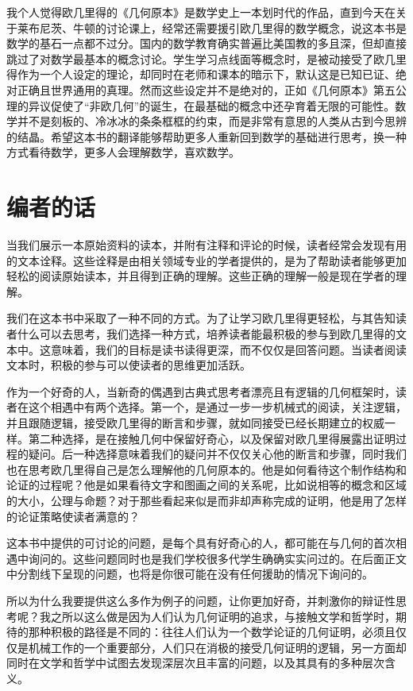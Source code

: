 \documentclass[
]{book}
\begin{document}
我个人觉得欧几里得的《几何原本》是数学史上一本划时代的作品，直到今天在关于莱布尼茨、牛顿的讨论课上，经常还需要援引欧几里得的数学概念，说这本书是数学的基石一点都不过分。国内的数学教育确实普遍比美国教的多且深，但却直接跳过了对数学最基本的概念讨论。学生学习点线面等概念时，是被动接受了欧几里得作为一个人设定的理论，却同时在老师和课本的暗示下，默认这是已知已证、绝对正确且世界通用的真理。然而这些设定并不是绝对的，正如《几何原本》第五公理的异议促使了``非欧几何''的诞生，在最基础的概念中还孕育着无限的可能性。数学并不是刻板的、冷冰冰的条条框框的约束，而是非常有意思的人类从古到今思辨的结晶。希望这本书的翻译能够帮助更多人重新回到数学的基础进行思考，换一种方式看待数学，更多人会理解数学，喜欢数学。

\hypertarget{ux7f16ux8005ux7684ux8bdd}{%
\chapter*{编者的话}\label{ux7f16ux8005ux7684ux8bdd}}

当我们展示一本原始资料的读本，并附有注释和评论的时候，读者经常会发现有用的文本诠释。这些诠释是由相关领域专业的学者提供的，是为了帮助读者能够更加轻松的阅读原始读本，并且得到正确的理解。这些正确的理解一般是现在学者的理解。

我们在这本书中采取了一种不同的方式。为了让学习欧几里得更轻松，与其告知读者什么可以去思考，我们选择一种方式，培养读者能最积极的参与到欧几里得的文本中。这意味着，我们的目标是读书读得更深，而不仅仅是回答问题。当读者阅读文本时，积极的参与可以使读者的思维更加活跃。

作为一个好奇的人，当新奇的偶遇到古典式思考者漂亮且有逻辑的几何框架时，读者在这个相遇中有两个选择。第一个，是通过一步一步机械式的阅读，关注逻辑，并且跟随逻辑，接受欧几里得的断言和步骤，就如同接受已经长期建立的权威一样。第二种选择，是在接触几何中保留好奇心，以及保留对欧几里得展露出证明过程的疑问。后一种选择意味着我们的疑问并不仅仅关心他的断言和步骤，同时我们也在思考欧几里得自己是怎么理解他的几何原本的。他是如何看待这个制作结构和论证的过程呢？他是如果看待文字和图画之间的关系呢，比如说相等的概念和区域的大小，公理与命题？对于那些看起来似是而非却声称完成的证明，他是用了怎样的论证策略使读者满意的？

这本书中提供的可讨论的问题，是每个具有好奇心的人，都可能在与几何的首次相遇中询问的。这些问题同时也是我们学校很多代学生确确实实问过的。在后面正文中分割线下呈现的问题，也将是你很可能在没有任何援助的情况下询问的。

所以为什么我要提供这么多作为例子的问题，让你更加好奇，并刺激你的辩证性思考呢？我之所以这么做是因为人们认为几何证明的追求，与接触文学和哲学时，期待的那种积极的路径是不同的：往往人们认为一个数学论证的几何证明，必须且仅仅是机械工作的一个重要部分，人们只在消极的接受几何证明的逻辑，另一方面却同时在文学和哲学中试图去发现深层次且丰富的问题，以及其具有的多种层次含义。
\end{document}
